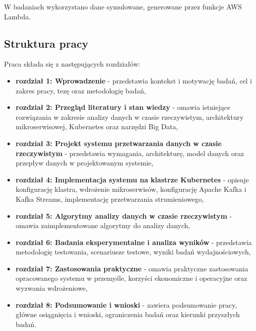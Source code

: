 W badaniach wykorzystano dane symulowane, generowane przez funkcje AWS Lambda.

\subsection{Struktura pracy}
\label{subsec:struktura}

Praca składa się z następujących rozdziałów:

\begin{itemize}
    \item \textbf{rozdział 1: Wprowadzenie} - przedstawia kontekst i motywację badań, cel i zakres pracy, tezę oraz metodologię badań,
    \item \textbf{rozdział 2: Przegląd literatury i stan wiedzy} - omawia istniejące rozwiązania w zakresie analizy danych w czasie rzeczywistym, architektury mikroserwisowej, Kubernetes oraz narzędzi Big Data,
    \item \textbf{rozdział 3: Projekt systemu przetwarzania danych w czasie rzeczywistym} - przedstawia wymagania, architekturę, model danych oraz przepływ danych w projektowanym systemie,
    \item \textbf{rozdział 4: Implementacja systemu na klastrze Kubernetes} - opisuje konfigurację klastra, wdrożenie mikroserwisów, konfigurację Apache Kafka i Kafka Streams, implementację przetwarzania strumieniowego,
    \item \textbf{rozdział 5: Algorytmy analizy danych w czasie rzeczywistym} - omawia zaimplementowane algorytmy do analizy danych,
    \item \textbf{rozdział 6: Badania eksperymentalne i analiza wyników} - przedstawia metodologię testowania, scenariusze testowe, wyniki badań wydajnościowych,
    \item \textbf{rozdział 7: Zastosowania praktyczne} - omawia praktyczne zastosowania opracowanego systemu w przemyśle, korzyści ekonomiczne i operacyjne oraz wyzwania wdrożeniowe,
    \item \textbf{rozdział 8: Podsumowanie i wnioski} - zawiera podsumowanie pracy, główne osiągnięcia i wnioski, ograniczenia badań oraz kierunki przyszłych badań.
\end{itemize} 
